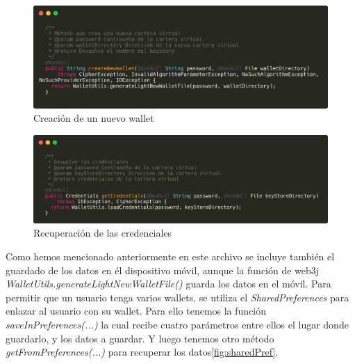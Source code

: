 % 

\begin{figure}[h!]
  \centering
  \includegraphics[width=0.8\linewidth]{figs/Desarrollo/SDK/crearWallet}
  \caption[Creación de un nuevo wallet]{Creación de un nuevo wallet}
  \label{fig:crearWallet}
\end{figure}

\begin{figure}[h!]
  \centering
  \includegraphics[width=0.8\linewidth]{figs/Desarrollo/SDK/recuperarCredenciales}
  \caption[Recuperación de las credenciales]{Recuperación de las credenciales}
  \label{fig:recuperarCredenciales}
\end{figure}

\vspace{5cm}
Como hemos mencionado anteriormente en este archivo se incluye también el guardado de los datos en él dispositivo móvil, aunque la función de web3j \textit{WalletUtils.generateLightNewWalletFile()} guarda los datos en el móvil. Para permitir que un usuario tenga varios wallets, se utiliza el \emph{SharedPreferences} para enlazar al usuario con su wallet. Para ello tenemos la función \textit{saveInPreferences(...)} la cual recibe cuatro parámetros entre ellos el lugar donde guardarlo, y los datos a guardar. Y luego tenemos otro método \textit{getFromPreferences(...)} para recuperar los datos\ref{fig:sharedPref}. \\

